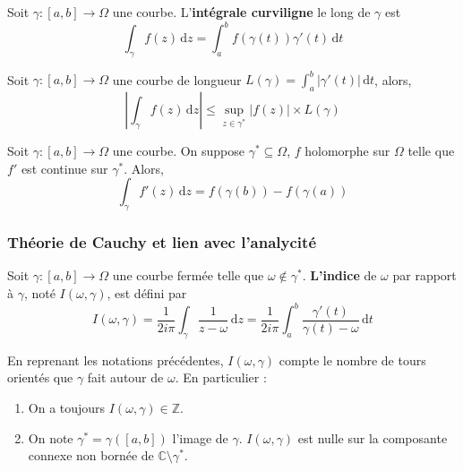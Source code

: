   \begin{definition}
    Soit $\gamma : [a,b] \rightarrow \Omega$ une courbe. L'\textbf{intégrale curviligne} le long de $\gamma$ est
    \[ \int_\gamma f(z) \, \mathrm{d}z = \int_a^b f(\gamma(t)) \gamma'(t) \, \mathrm{d}t \]
  \end{definition}

  \begin{proposition}
    Soit $\gamma : [a,b] \rightarrow \Omega$ une courbe de longueur $L(\gamma) = \int_{a}^{b} \vert \gamma'(t) \vert \, \mathrm{d}t$, alors,
    \[ \left\vert \int_\gamma f(z) \, \mathrm{d}z \right\vert \leq \sup_{z \in \gamma^*} \vert f(z) \vert \times L(\gamma) \]
  \end{proposition}

  \begin{proposition}
    Soit $\gamma : [a,b] \rightarrow \Omega$ une courbe. On suppose $\gamma^* \subseteq \Omega$, $f$ holomorphe sur $\Omega$ telle que $f'$ est continue sur $\gamma^*$. Alors,
    \[ \int_\gamma f'(z) \, \mathrm{d}z = f(\gamma(b)) - f(\gamma(a)) \]
  \end{proposition}

  \subsubsection{Théorie de Cauchy et lien avec l'analycité}

  \begin{definition}
    Soit $\gamma : [a,b] \rightarrow \Omega$ une courbe fermée telle que $\omega \notin \gamma^*$. \textbf{L'indice} de $\omega$ par rapport à $\gamma$, noté $I(\omega, \gamma)$, est défini par
    \[ I(\omega, \gamma) = \frac{1}{2i\pi} \int_\gamma \frac{1}{z-\omega} \, \mathrm{d}z = \frac{1}{2i\pi} \int_a^b \frac{\gamma'(t)}{\gamma(t)-\omega} \, \mathrm{d}t \]
  \end{definition}

  \begin{remark}
    En reprenant les notations précédentes, $I(\omega, \gamma)$ compte le nombre de tours orientés que $\gamma$ fait autour de $\omega$. En particulier :
    \begin{enumerate}[label={\bfseries(\roman*)}]
      \item On a toujours $I(\omega, \gamma) \in \mathbb{Z}$.
      \item On note $\gamma^* = \gamma([a,b])$ l'image de $\gamma$. $I(\omega, \gamma)$ est nulle sur la composante connexe non bornée de $\mathbb{C} \setminus \gamma^*$.
    \end{enumerate}
  \end{remark}

